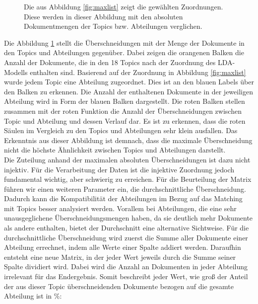 \documentclass[german,version-2020-11]{uzl-thesis}
\begin{document}
\begin{itemize}
\begin{enumerate}
\begin{figure}[H]
\begin{center}
\begin{tikzpicture}
\end{tikzpicture}

\end{center}
\caption{Die aus Abbildung \ref{fig:maxlist} zeigt die gewählten Zuordnungen. Diese werden in dieser Abbildung mit den absoluten Dokumentmengen der Topics bzw. Abteilungen verglichen.}
\label{fig:comp}
\end{figure}

Die Abbildung \ref{fig:comp} stellt die Überschneidungen mit der Menge der Dokumente in den Topics und Abteilungen gegenüber. Dabei zeigen die orangenen Balken die Anzahl der Dokumente, die in den 18 Topics nach der Zuordnung des LDA-Modells enthalten sind. Basierend auf der Zuordnung in Abbildung \ref{fig:maxlist} wurde jedem Topic eine Abteilung zugeordnet. Dies ist an den blauen Labels über den Balken zu erkennen. Die Anzahl der enthaltenen Dokumente in der jeweiligen Abteilung wird in Form der blauen Balken dargestellt. Die roten Balken stellen zusammen mit der roten Funktion die Anzahl der Überschneidungen zwischen Topic und Abteilung und dessen Verlauf dar. Es ist zu erkennen, dass die roten Säulen im Vergleich zu den Topics und Abteilungen sehr klein ausfallen. Das Erkenntnis aus dieser Abbildung ist demnach, dass die maximale Überschneidung nicht die höchste Ähnlichkeit zwischen Topics und Abteilungen darstellt. \\

Die Zuteilung anhand der maximalen absoluten Überschneidungen ist dazu nicht injektiv. Für die Verarbeitung der Daten ist die injektive Zuordnung jedoch fundamental wichtig, aber schwierig zu erreichen. Für die Beurteilung der Matrix führen wir einen weiteren Parameter ein, die durchschnittliche Überschneidung. Dadurch kann die Kompatibilität der Abteilungen im Bezug auf das Matching mit Topics besser analysiert werden. Vorallem bei Abteilungen, die eine sehr unausgeglichene Überschneidungsmengen haben, da sie deutlich mehr Dokumente als andere enthalten, bietet der Durchschnitt eine alternative Sichtweise. Für die durchschnittliche Überschneidung wird zuerst die Summe aller Dokumente einer Abteilung errechnet, indem alle Werte einer Spalte addiert werden. Daraufhin entsteht eine neue Matrix, in der jeder Wert jeweils durch die Summe seiner Spalte dividiert wird. Dabei wird die Anzahl an Dokumenten in jeder Abteilung irrelevant für das Endergebnis. Somit beschreibt jeder Wert, wie groß der Anteil der aus dieser Topic überschneidenden Dokumente bezogen auf die gesamte Abteilung ist in $\%$: \\


\end{enumerate}
\end{itemize}
\end{document}
